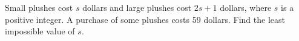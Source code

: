 Small plushes cost $s$ dollars and large plushes cost $2s+1$ dollars, where $s$ is a positive integer. A purchase of some plushes costs 59 dollars. Find the least impossible value of $s$.
